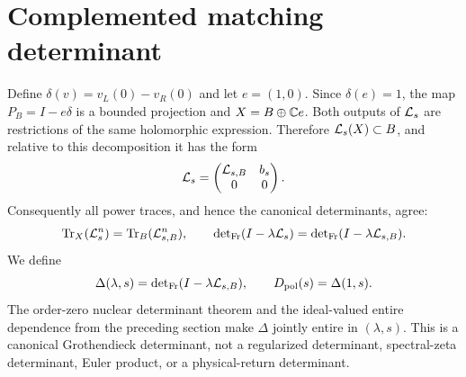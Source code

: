 \section{Complemented matching determinant}
Define \(\delta(v)=v_L(0)-v_R(0)\) and let \(e=(1,0)\). Since
\(\delta(e)=1\), the map \(P_B=I-e\delta\) is a bounded projection and
\(X=B\oplus\mathbb{C} e\). Both outputs of \(\mathcal{L}_s\) are restrictions of the same
holomorphic expression. Therefore \(\mathcal{L}_s(X)\subset B\), and relative to
this decomposition it has the form
\[
 \mathcal{L}_s=\begin{pmatrix}\mathcal{L}_{s,B}&b_s\\0&0\end{pmatrix}.
\]
Consequently all power traces, and hence the canonical determinants, agree:
\[
 \operatorname{Tr}_X(\mathcal{L}_s^n)=\operatorname{Tr}_B(\mathcal{L}_{s,B}^n),\qquad
 \operatorname{det}_{\mathrm{Fr}}(I-\lambda\mathcal{L}_s)=\operatorname{det}_{\mathrm{Fr}}(I-\lambda\mathcal{L}_{s,B}).
\]
We define
\[
 \Delta(\lambda,s)=\operatorname{det}_{\mathrm{Fr}}(I-\lambda\mathcal{L}_{s,B}),
 \qquad D_{\rm pol}(s)=\Delta(1,s).
\]
The order-zero nuclear determinant theorem and the ideal-valued entire
dependence from the preceding section make \(\Delta\) jointly entire in
\((\lambda,s)\). This is a canonical Grothendieck determinant, not a
regularized determinant, spectral-zeta determinant, Euler product, or a
physical-return determinant.
